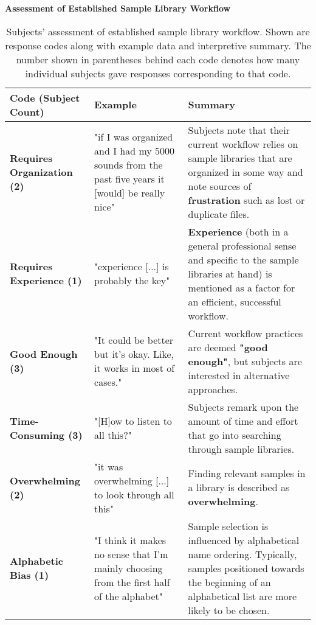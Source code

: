 


\begin{table}[!htb]
  \renewcommand{\arraystretch}{1.2}
  \centering
  \textbf{Assessment of Established Sample Library Workflow} \\ [3mm]
  \footnotesize
  \colorbox{light-bg}{
  \begin{tabular}{ p{4.0cm} p{4.75cm} p{4.75cm} }
  \hline
    \textbf{Code (Subject Count)} & \textbf{Example} & \textbf{Summary} \\
    \hline
    \textbf{Requires Organization (2)}
    &
    "if I was organized and I had my 5000 sounds from the past five years it
    [would] be really nice"
    &
    Subjects note that their current workflow relies on sample libraries that
    are organized in some way and note sources of \textbf{frustration} such as
    lost or duplicate files.
    \\
    \textbf{Requires Experience (1)}
    &
    "experience [...] is probably the key"
    &
    \textbf{Experience} (both in a general professional sense and specific to
    the sample libraries at hand) is mentioned as a factor for an efficient,
    successful workflow.
    \\
    \textbf{Good Enough (3)}
    &
    "It could be better but it's okay. Like, it works in most of cases."
    &
    Current workflow practices are deemed \textbf{"good enough"}, but subjects
    are interested in alternative approaches.
    \\
    \textbf{Time-Consuming (3)}
    &
    "[H]ow to listen to all this?"
    &
    Subjects remark upon the amount of time and effort that go into searching
    through sample libraries.
    \\
    \textbf{Overwhelming (2)}
    &
    "it was overwhelming [...] to look through all this"
    &
    Finding relevant samples in a library is described as \textbf{overwhelming}.
    \\
    \textbf{Alphabetic Bias (1)}
    &
    "I think it makes no sense that I'm mainly choosing from the first half of
    the alphabet"
    &
    Sample selection is influenced by alphabetical name ordering. Typically,
    samples positioned towards the beginning of an alphabetical list are more
    likely to be chosen.
    \\
  \end{tabular}}
  \caption[Established Sample Library Workflow Assessment: Response Codes]
  {Subjects' assessment of established sample library workflow. Shown are
  response codes along with example data and interpretive summary. The number
  shown in parentheses behind each code denotes how many individual subjects
  gave responses corresponding to that code.}
  \label{table:current_workflow_assessment}
\end{table}

